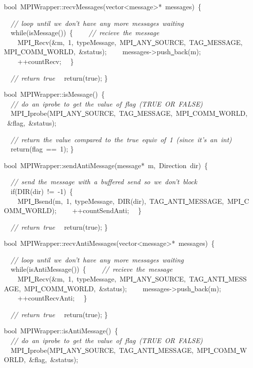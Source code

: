 {bool\ MPIWrapper::recvMessages(vector<{}message>{}*\ messages)\ \{

\ \ \textsl{//\ loop\ until\ we\ don't\ have\ any\ more\ messages\ waiting}
\ \ while(isMessage())\ \{
\ \ \ \ \textsl{//\ recieve\ the\ message}
\ \ \ \ MPI\underline\ Recv(\&m,\ 1,\ typeMessage,\ MPI\underline\ ANY\underline\ SOURCE,\ TAG\underline\ MESSAGE,\ MPI\underline\ COMM\underline\ WORLD,\ \&status);
\ \ \ \ messages-{}>{}push\underline\ back(m);
\ \ \ \ ++countRecv;
\ \ \}

\ \ \textsl{//\ return\ true}
\ \ return(true);
\}

bool\ MPIWrapper::isMessage()\ \{
\ \ \textsl{//\ do\ an\ iprobe\ to\ get\ the\ value\ of\ flag\ (TRUE\ OR\ FALSE)}
\ \ MPI\underline\ Iprobe(MPI\underline\ ANY\underline\ SOURCE,\ TAG\underline\ MESSAGE,\ MPI\underline\ COMM\underline\ WORLD,\ \&flag,\ \&status);

\ \ \textsl{//\ return\ the\ value\ compared\ to\ the\ true\ equiv\ of\ 1\ (since\ it's\ an\ int)}
\ \ return(flag\ ==\ 1);
\}

bool\ MPIWrapper::sendAntiMessage(message*\ m,\ Direction\ dir)\ \{

\ \ \textsl{//\ send\ the\ message\ with\ a\ buffered\ send\ so\ we\ don't\ block}
\ \ if(DIR(dir)\ !=\ -{}1)\ \{
\ \ \ \ MPI\underline\ Bsend(m,\ 1,\ typeMessage,\ DIR(dir),\ TAG\underline\ ANTI\underline\ MESSAGE,\ MPI\underline\ COMM\underline\ WORLD);
\ \ \ \ ++countSendAnti;
\ \ \}

\ \ \textsl{//\ return\ true}
\ \ return(true);
\}

bool\ MPIWrapper::recvAntiMessages(vector<{}message>{}*\ messages)\ \{

\ \ \textsl{//\ loop\ until\ we\ don't\ have\ any\ more\ messages\ waiting}
\ \ while(isAntiMessage())\ \{
\ \ \ \ \textsl{//\ recieve\ the\ message}
\ \ \ \ MPI\underline\ Recv(\&m,\ 1,\ typeMessage,\ MPI\underline\ ANY\underline\ SOURCE,\ TAG\underline\ ANTI\underline\ MESSAGE,\ MPI\underline\ COMM\underline\ WORLD,\ \&status);
\ \ \ \ messages-{}>{}push\underline\ back(m);
\ \ \ \ ++countRecvAnti;
\ \ \}

\ \ \textsl{//\ return\ true}
\ \ return(true);
\}

bool\ MPIWrapper::isAntiMessage()\ \{
\ \ \textsl{//\ do\ an\ iprobe\ to\ get\ the\ value\ of\ flag\ (TRUE\ OR\ FALSE)}
\ \ MPI\underline\ Iprobe(MPI\underline\ ANY\underline\ SOURCE,\ TAG\underline\ ANTI\underline\ MESSAGE,\ MPI\underline\ COMM\underline\ WORLD,\ \&flag,\ \&status);

}
